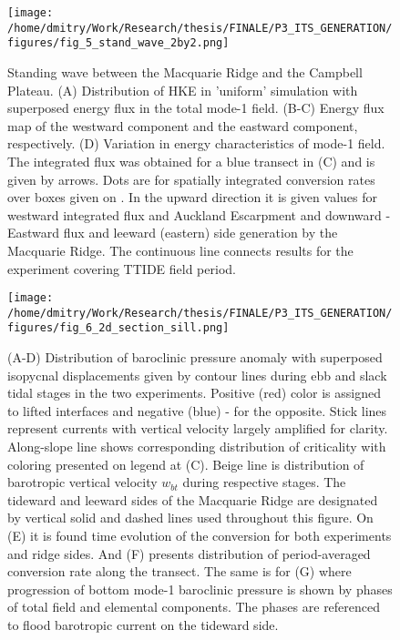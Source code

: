 \documentclass[12pt]{article}
\begin{document}
\begin{figure}
	\centering
	\texttt{[image: /home/dmitry/Work/Research/thesis/FINALE/P3\_ITS\_GENERATION/figures/fig\_5\_stand\_wave\_2by2.png]}
	\caption{Standing wave between the Macquarie Ridge and the Campbell Plateau. (A) Distribution 
	of HKE in 'uniform' simulation with superposed energy flux in the total mode-1 field. (B-C) 
	Energy flux map of the westward component and the eastward component, respectively. (D) 
	Variation in energy characteristics of mode-1 field. The integrated flux was obtained for a 	
	blue transect in (C) and is given by arrows. Dots are for spatially integrated conversion rates 
	over boxes given on . In the upward direction it is given values for 
	westward integrated flux and Auckland Escarpment and downward - Eastward flux and leeward 
	(eastern) side generation by the Macquarie Ridge. The continuous line connects results for the 
	experiment covering TTIDE field period.}
	\label{C3.fig:stand_wave}
\end{figure}

\begin{figure}
	\centering
	\texttt{[image: /home/dmitry/Work/Research/thesis/FINALE/P3\_ITS\_GENERATION/figures/fig\_6\_2d\_section\_sill.png]}
	\caption{(A-D) Distribution of baroclinic pressure anomaly with superposed isopycnal 
	displacements given by contour lines during ebb and slack tidal stages in the two experiments. 
	Positive (red) color is assigned to lifted interfaces and negative (blue) - for the opposite. 
	Stick lines represent currents with vertical velocity largely amplified for clarity. 
	Along-slope line shows corresponding distribution of criticality with coloring presented on 
	legend at (C). Beige line is distribution of barotropic vertical velocity $w_{bt}$ during 
	respective stages. The tideward and leeward sides of the Macquarie Ridge are designated by 
	vertical solid and dashed lines used throughout this figure. On (E) it is found time evolution 
	of the conversion for both experiments and ridge sides. And (F) presents distribution of 
	period-averaged conversion rate along the transect. The same is for (G) where progression of 
	bottom mode-1 baroclinic pressure is shown by phases of total field and elemental 
	components. The phases are referenced to flood barotropic current on the tideward side.}
	\label{C3.fig:gen_2d}
\end{figure}
\end{document}
